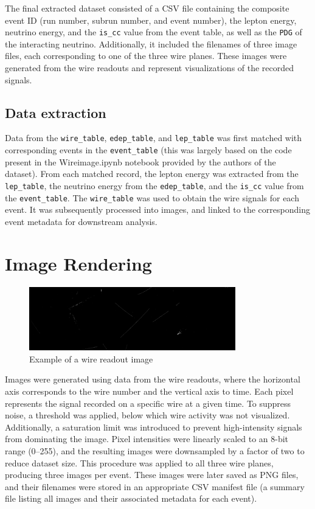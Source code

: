 \documentclass{pracalicmgr}
\begin{document}
The final extracted dataset consisted of a CSV file containing the composite event ID (run number, subrun number, and event number), the lepton energy, neutrino energy, and the \texttt{is\_cc} value from the event table, as well as the \texttt{PDG} of the interacting neutrino. Additionally, it included the filenames of three image files, each corresponding to one of the three wire planes. These images were generated from the wire readouts and represent visualizations of the recorded signals.

\subsection{Data extraction}

Data from the \texttt{wire\_table}, \texttt{edep\_table}, and \texttt{lep\_table} was first matched with corresponding events in the \texttt{event\_table} (this was largely based on the code present in the Wireimage.ipynb notebook provided by the authors of the dataset). From each matched record, the lepton energy was extracted from the \texttt{lep\_table}, the neutrino energy from the \texttt{edep\_table}, and the \texttt{is\_cc} value from the \texttt{event\_table}. The \texttt{wire\_table} was used to obtain the wire signals for each event. It was subsequently processed into images, and linked to the corresponding event metadata for downstream analysis.

\section{Image Rendering}

\begin{figure}[H]
    \centering
    \includegraphics[width=0.8\textwidth]{src/with_flag_58.png}
    \caption{Example of a wire readout image}
\end{figure}

Images were generated using data from the wire readouts, where the horizontal axis corresponds to the wire number and the vertical axis to time. Each pixel represents the signal recorded on a specific wire at a given time. To suppress noise, a threshold was applied, below which wire activity was not visualized. Additionally, a saturation limit was introduced to prevent high-intensity signals from dominating the image. Pixel intensities were linearly scaled to an 8-bit range (0--255), and the resulting images were downsampled by a factor of two to reduce dataset size. This procedure was applied to all three wire planes, producing three images per event. These images were later saved as PNG files, and their filenames were stored in an appropriate CSV manifest file (a summary file listing all images and their associated metadata for each event).
\end{document}
